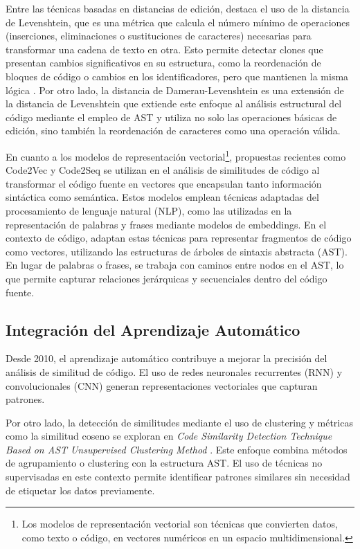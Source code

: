 Entre las técnicas basadas en distancias de edición, destaca el uso de la distancia de Levenshtein, que es una métrica que calcula el número mínimo de operaciones (inserciones, eliminaciones o sustituciones de caracteres) necesarias para transformar una cadena de texto en otra. Esto permite detectar clones que presentan cambios significativos en su estructura, como la reordenación de bloques de código o cambios en los identificadores, pero que mantienen la misma lógica \cite{levenshteinCloneDetection}. Por otro lado, la distancia de Damerau-Levenshtein \cite{damerauLevenshteinPlagiarismAST} es una extensión de la distancia de Levenshtein que extiende este enfoque al análisis estructural del código mediante el empleo de AST y utiliza no solo las operaciones básicas de edición, sino también la reordenación de caracteres como una operación válida.

En cuanto a los modelos de representación vectorial\footnote{Los modelos de representación vectorial son técnicas que convierten datos, como texto o código, en vectores numéricos en un espacio multidimensional.}, propuestas recientes como Code2Vec \cite{alon2019code2vec} y Code2Seq \cite{alon2019code2seq} se utilizan en el análisis de similitudes de código al transformar el código fuente en vectores que encapsulan tanto información sintáctica como semántica. Estos modelos emplean técnicas adaptadas del procesamiento de lenguaje natural (NLP), como las utilizadas en la representación de palabras y frases mediante modelos de embeddings. En el contexto de código, adaptan estas técnicas para representar fragmentos de código como vectores, utilizando las estructuras de árboles de sintaxis abstracta (AST). En lugar de palabras o frases, se trabaja con caminos entre nodos en el AST, lo que permite capturar relaciones jerárquicas y secuenciales dentro del código fuente.

\subsection{Integración del Aprendizaje Automático}
Desde 2010, el aprendizaje automático contribuye a mejorar la precisión del análisis de similitud de código. El uso de redes neuronales recurrentes (RNN) \cite{hochreiter1997long} y convolucionales (CNN) \cite{lecun1998gradient} generan representaciones vectoriales que capturan patrones.

Por otro lado, la detección de similitudes mediante el uso de clustering y métricas como la similitud coseno se exploran en \textit{Code Similarity Detection Technique Based on AST Unsupervised Clustering Method} \cite{iccc2020clustering}. Este enfoque combina métodos de agrupamiento o clustering con la estructura AST. El uso de técnicas no supervisadas en este contexto permite identificar patrones similares sin necesidad de etiquetar los datos previamente.

